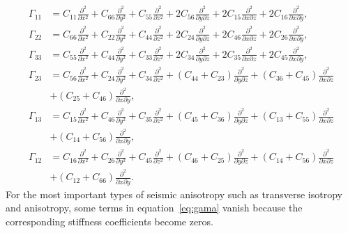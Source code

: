 \begin{equation}
\label{eq:gama}
\begin{split}
\Gamma_{11} &= 
              C_{11}\frac{\partial^2}{\partial x^2}
            + C_{66}\frac{\partial^2}{\partial y^2}
            + C_{55}\frac{\partial^2}{\partial z^2} 
            + 2C_{56}\frac{\partial^2}{{\partial y}{\partial z}} 
            + 2C_{15}\frac{\partial^2}{{\partial x}{\partial z}}
            + 2C_{16}\frac{\partial^2}{{\partial x}{\partial y}}, \\
\Gamma_{22} &= 
              C_{66}\frac{\partial^2}{\partial x^2}
            + C_{22}\frac{\partial^2}{\partial y^2}
            + C_{44}\frac{\partial^2}{\partial z^2}
            + 2C_{24}\frac{\partial^2}{{\partial y}{\partial z}}
            + 2C_{46}\frac{\partial^2}{{\partial x}{\partial z}}
            + 2C_{26}\frac{\partial^2}{{\partial x}{\partial y}}, \\
\Gamma_{33} &= 
              C_{55}\frac{\partial^2}{\partial x^2}
            + C_{44}\frac{\partial^2}{\partial y^2}
            + C_{33}\frac{\partial^2}{\partial z^2}
            + 2C_{34}\frac{\partial^2}{{\partial y}{\partial z}}
            + 2C_{35}\frac{\partial^2}{{\partial x}{\partial z}}
            + 2C_{45}\frac{\partial^2}{{\partial x}{\partial y}}, \\
\Gamma_{23} &= 
              C_{56}\frac{\partial^2}{\partial x^2}
            + C_{24}\frac{\partial^2}{\partial y^2}
            + C_{34}\frac{\partial^2}{\partial z^2}
            +(C_{44}+C_{23})\frac{\partial^2}{{\partial y}{\partial z}}
            +(C_{36}+C_{45})\frac{\partial^2}{{\partial x}{\partial z}} \\
            &+(C_{25}+C_{46})\frac{\partial^2}{{\partial x}{\partial y}}, \\
\Gamma_{13} &= 
              C_{15}\frac{\partial^2}{\partial x^2}
            + C_{46}\frac{\partial^2}{\partial y^2}
            + C_{35}\frac{\partial^2}{\partial z^2}
            +(C_{45}+C_{36})\frac{\partial^2}{{\partial y}{\partial z}}
            +(C_{13}+C_{55})\frac{\partial^2}{{\partial x}{\partial z}} \\
            &+(C_{14}+C_{56})\frac{\partial^2}{{\partial x}{\partial y}}, \\
\Gamma_{12} &= 
              C_{16}\frac{\partial^2}{\partial x^2}
            + C_{26}\frac{\partial^2}{\partial y^2}
            + C_{45}\frac{\partial^2}{\partial z^2} 
            +(C_{46}+C_{25})\frac{\partial^2}{{\partial y}{\partial z}}
            +(C_{14}+C_{56})\frac{\partial^2}{{\partial x}{\partial z}} \\
            &+(C_{12}+C_{66})\frac{\partial^2}{{\partial x}{\partial y}}.
\end{split}
\end{equation}
For the most important types of seismic anisotropy such as transverse isotropy and   anisotropy,
 some terms in equation~\ref{eq:gama} vanish
because the corresponding stiffness coefficients become zeros.


